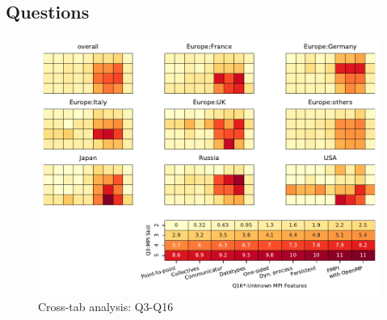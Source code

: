 
\subsection{Questions}


\begin{figure}
\begin{center}
\includegraphics[width=12cm]{../pdfs/Q3-Q16.pdf}
\caption{Cross-tab analysis: Q3-Q16}
\label{fig:Q3-Q16}
\end{center}
\end{figure}
